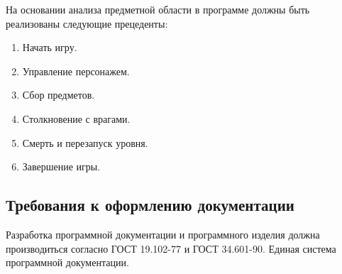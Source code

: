 На основании анализа предметной области в программе должны быть реализованы следующие прецеденты:
\begin{enumerate}
\item Начать игру.
\item Управление персонажем.
\item Сбор предметов.
\item Столкновение с врагами.
\item Смерть и перезапуск уровня.
\item Завершение игры.
\end{enumerate}

\subsection{Требования к оформлению документации}

Разработка программной документации и программного изделия должна производиться согласно ГОСТ 19.102-77 и ГОСТ 34.601-90. Единая система программной документации.
